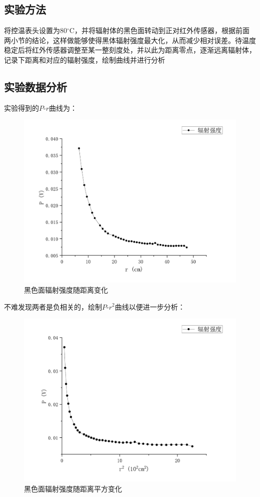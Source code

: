 \documentclass{WHUReport}
\begin{document}
\begin{multicols}{2}
	\subsection{实验方法}
	将控温表头设置为$80\operatorname{^\circ C}$，并将辐射体的黑色面转动到正对红外传感器，根据前面两小节的结论，这样做能够使得黑体辐射强度最大化，从而减少相对误差。待温度稳定后将红外传感器调整至某一整刻度处，并以此为距离零点，逐渐远离辐射体，记录下距离和对应的辐射强度，绘制曲线并进行分析
	
	\subsection{实验数据分析}
	实验得到的$P\mbox{-}r$曲线为：
	\begin{figure}[H]
		\centering
		\includegraphics[width=\linewidth]{figs/P-S.pdf}
		\caption{黑色面辐射强度随距离变化}
	\end{figure}
	不难发现两者是负相关的，绘制$P\mbox{-}r^2$曲线以便进一步分析：
	\begin{figure}[H]
		\centering
		\includegraphics[width=\linewidth]{figs/P-S2.pdf}
		\caption{黑色面辐射强度随距离平方变化}
	\end{figure}


\end{multicols}
\end{document}
